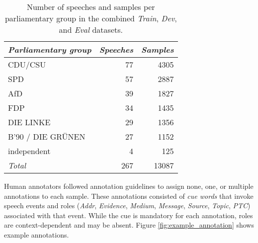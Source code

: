 \documentclass[11pt,a4paper]{article}
\begin{document}
\begin{table}
    \centering
    \begin{tabularx}{\linewidth}{Xrr}
        \toprule
        \emph{Parliamentary group} & \emph{Speeches} & \emph{Samples} \\
        \midrule
        CDU/CSU                      & 77                & 4305           \\
        SPD                          & 57                & 2887           \\
        AfD                          & 39                & 1827           \\
        FDP                          & 34                & 1435           \\
        DIE LINKE                    & 29                & 1356           \\
        B'90 / DIE GRÜNEN            & 27                & 1152           \\
        independent                  & 4                 & 125            \\
        \midrule
        \emph{Total}               & 267               & 13087          \\
        \bottomrule
    \end{tabularx}
    \caption{Number of speeches and samples per parliamentary group in the combined \emph{Train}, \emph{Dev}, and \emph{Eval} datasets.}
    \label{tab:data_speeches_units_per_group}
\end{table}

Human annotators followed annotation guidelines \cite{GermEval2023} to assign none, one, or multiple annotations to each sample.
These annotations consisted of \emph{cue words} that invoke speech events and roles (\emph{Addr}, \emph{Evidence}, \emph{Medium}, \emph{Message}, \emph{Source}, \emph{Topic}, \emph{PTC}) associated with that event.
While the cue is mandatory for each annotation, roles are context-dependent and may be absent.
Figure \ref{fig:example_annotation} shows example annotations.
\end{document}
